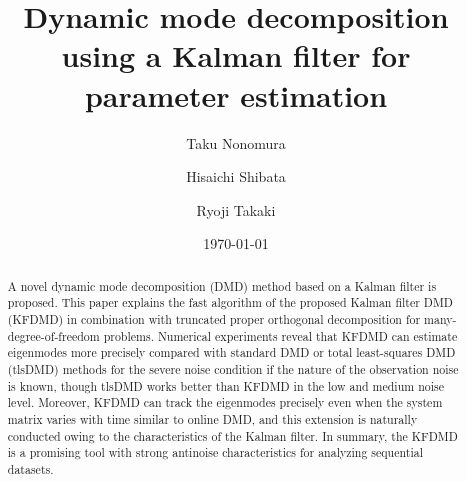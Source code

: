 \documentclass[aip,graphicx]{revtex4-1}
\begin{document}

\title{Dynamic mode decomposition using a Kalman filter for parameter estimation}


\author{Taku Nonomura}
\author{Hisaichi Shibata}
\author{Ryoji Takaki}

\date{\today}

\begin{abstract}
A novel dynamic mode decomposition (DMD) method based on a Kalman filter is proposed. This paper explains the fast algorithm of the proposed Kalman filter DMD (KFDMD) in combination with truncated proper orthogonal decomposition for many-degree-of-freedom problems. Numerical experiments reveal that KFDMD can estimate eigenmodes more precisely compared with standard DMD or total least-squares DMD (tlsDMD) methods for the severe noise condition if the nature of the observation noise is known, though tlsDMD works better than KFDMD in the low and medium noise level.  Moreover, KFDMD can track the eigenmodes precisely even when the system matrix varies with time similar to online DMD, and this extension is naturally conducted owing to the characteristics of the Kalman filter. In summary, the KFDMD is a promising tool with strong antinoise characteristics for analyzing sequential datasets.
\end{abstract}
\end{document}
